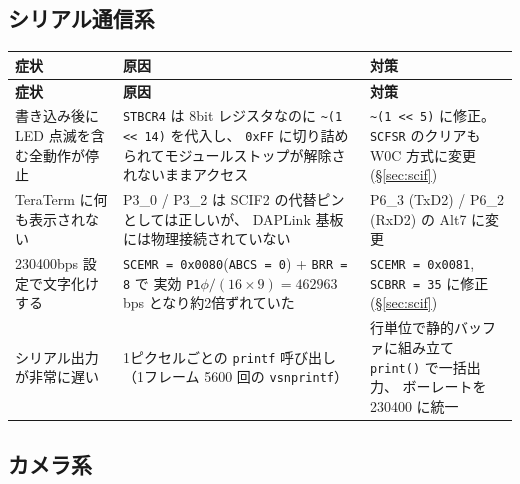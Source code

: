 \documentclass[a4paper,11pt,dvipdfmx]{jsarticle}
\begin{document}
\subsection{シリアル通信系}

\begin{longtable}{p{40mm} p{55mm} p{55mm}}
\toprule
\textbf{症状} & \textbf{原因} & \textbf{対策} \\
\midrule
\endfirsthead
\toprule
\textbf{症状} & \textbf{原因} & \textbf{対策} \\
\midrule
\endhead
書き込み後に LED 点滅を含む全動作が停止 &
  \texttt{STBCR4} は 8bit レジスタなのに \texttt{\textasciitilde(1 << 14)} を代入し、
  \texttt{0xFF} に切り詰められてモジュールストップが解除されないままアクセス &
  \texttt{\textasciitilde(1 << 5)} に修正。
  \texttt{SCFSR} のクリアも W0C 方式に変更 (\hyperref[sec:scif]{§\ref*{sec:scif}}) \\
TeraTerm に何も表示されない &
  P3\_0 / P3\_2 は SCIF2 の代替ピンとしては正しいが、
  DAPLink 基板には物理接続されていない &
  P6\_3 (TxD2) / P6\_2 (RxD2) の Alt7 に変更 \\
230400bps 設定で文字化けする &
  \texttt{SCEMR = 0x0080}(\texttt{ABCS = 0}) + \texttt{BRR = 8} で
  実効 \texttt{P1}$\phi/(16 \times 9) = 462963$bps となり約2倍ずれていた &
  \texttt{SCEMR = 0x0081}, \texttt{SCBRR = 35} に修正
  (\hyperref[sec:scif]{§\ref*{sec:scif}}) \\
シリアル出力が非常に遅い &
  1ピクセルごとの \texttt{printf} 呼び出し（1フレーム 5600 回の \texttt{vsnprintf}） &
  行単位で静的バッファに組み立て \texttt{print()} で一括出力、
  ボーレートを 230400 に統一 \\
\bottomrule
\end{longtable}

\subsection{カメラ系}
\end{document}
